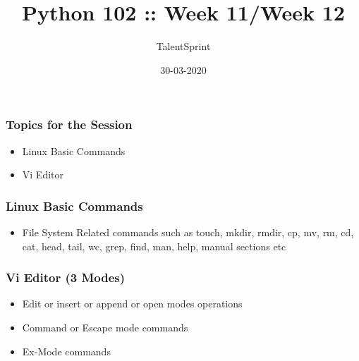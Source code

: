 \documentclass[14pt]{beamer}
\title{Python 102 :: Week 11/Week 12}
\date{30-03-2020}
\author[TS]{TalentSprint}
\begin{document}
 
    \begin{frame}
        \titlepage
    \end{frame}
    \begin{frame}
        \frametitle{Topics for the Session}
        \begin{itemize}
            \item Linux Basic Commands
            \item Vi Editor
        \end{itemize}
    \end{frame}

    \begin{frame}
        \frametitle{Linux Basic Commands}
        \begin{itemize}
            \item File System Related commands such as touch, mkdir, rmdir, cp, mv, rm, cd, cat, head, tail, wc, grep, find, man, help, manual sections etc
        \end{itemize}
    \end{frame}

    \begin{frame}
        \frametitle{Vi Editor (3 Modes)}
        \begin{itemize}
            \item Edit or insert or append or open modes operations
            \item Command or Escape mode commands
            \item Ex-Mode commands
        \end{itemize}
    \end{frame}
\end{document}
